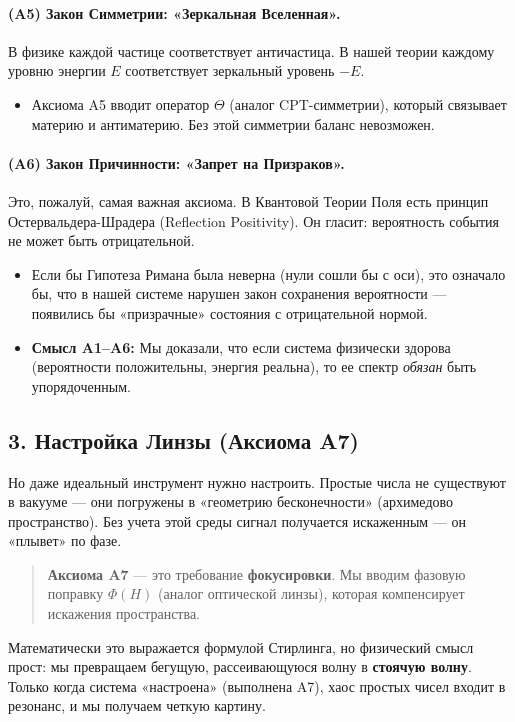 \documentclass{article}
\numberwithin{equation}{section}
\theoremstyle{plain}
\theoremstyle{definition}
\theoremstyle{remark}
\begin{document}
\paragraph{(A5) Закон Симметрии: «Зеркальная Вселенная».}
В физике каждой частице соответствует античастица. В нашей теории каждому уровню энергии $E$ соответствует зеркальный уровень $-E$.
\begin{itemize}
    \item Аксиома A5 вводит оператор $\Theta$ (аналог CPT-симметрии), который связывает материю и антиматерию. Без этой симметрии баланс невозможен.
\end{itemize}

\paragraph{(A6) Закон Причинности: «Запрет на Призраков».}
Это, пожалуй, самая важная аксиома. В Квантовой Теории Поля есть принцип Остервальдера-Шрадера (Reflection Positivity). Он гласит: вероятность события не может быть отрицательной.
\begin{itemize}
    \item Если бы Гипотеза Римана была неверна (нули сошли бы с оси), это означало бы, что в нашей системе нарушен закон сохранения вероятности — появились бы «призрачные» состояния с отрицательной нормой.
    \item \textbf{Смысл A1–A6:} Мы доказали, что если система физически здорова (вероятности положительны, энергия реальна), то ее спектр \emph{обязан} быть упорядоченным.
\end{itemize}

\subsection*{3. Настройка Линзы (Аксиома A7)}

Но даже идеальный инструмент нужно настроить. Простые числа не существуют в вакууме — они погружены в «геометрию бесконечности» (архимедово пространство).
Без учета этой среды сигнал получается искаженным — он «плывет» по фазе.

\begin{quote}
\textbf{Аксиома A7} — это требование \textbf{фокусировки}. Мы вводим фазовую поправку $\Phi(H)$ (аналог оптической линзы), которая компенсирует искажения пространства.
\end{quote}

Математически это выражается формулой Стирлинга, но физический смысл прост: мы превращаем бегущую, рассеивающуюся волну в \textbf{стоячую волну}. Только когда система «настроена» (выполнена A7), хаос простых чисел входит в резонанс, и мы получаем четкую картину.
\end{document}
